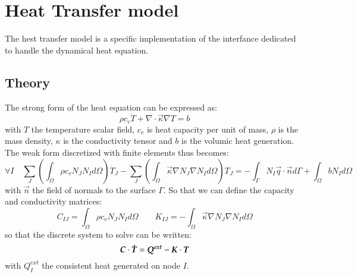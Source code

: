 \section{Heat Transfer model}

The hest transfer model is a specific implementation of the  interfance
dedicated to handle the dynamical heat equation. 
\subsection{Theory}
The strong form of the heat equation 
can be expressed as:
\begin{equation}
  \rho c_v \dot{T} + \nabla \cdot \vec{\kappa} \nabla T = b
\end{equation}
with $T$ the temperature scalar field,
$c_v$ is heat capacity per unit of mass, $\rho$ is the mass density, 
$\kappa$ is the conductivity tensor and $b$ is the volumic heat generation. 
The weak form discretized with finite elements thus becomes:
\begin{equation}
  \forall I \quad 
  \sum_J \left( \int_\Omega \rho c_v N_J N_I  d\Omega \right) \dot{T}_J 
  - \sum_J \left( \int_\Omega \vec{\kappa} \nabla N_J \nabla N_I d\Omega \right) T_J = 
  - \int_{\Gamma}  N_I \vec{q} \cdot \vec{n} d\Gamma + \int_\Omega b N_I d\Omega
\end{equation}
with $\vec{n}$ the field of normals to the surface $\Gamma$. 
So that we can define the capacity and conductivity matrices:
\begin{equation}
  C_{IJ} = \int_\Omega \rho c_v N_J N_I  d\Omega \qquad   
  K_{IJ} = - \int_\Omega \vec{\kappa} \nabla N_J \nabla N_I d\Omega
\end{equation}
so that the discrete system to solve can be written:
\begin{equation}
  \boldsymbol{C} \cdot \boldsymbol{\dot{T}} = \boldsymbol{Q^{ext}} -\boldsymbol{K} \cdot \boldsymbol{T} 
\end{equation}
with $Q^{ext}_I$ the consistent heat generated on node $I$.
